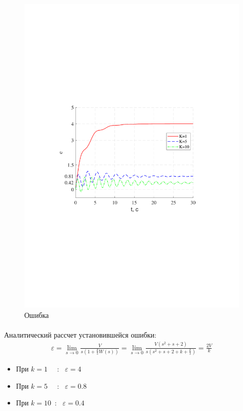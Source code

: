 \documentclass[a4paper,12pt]{article}
\begin{document}
	\begin{figure}[h!]
		\begin{center}			
		\renewcommand{\figurename}{Рисунок}
		\includegraphics[width=5in]{err2ast1MOD.pdf}
		\caption{Ошибка}
		\label{s_12}
		\end{center}
	\end{figure}
	\newpage		
	\paragraph {} Аналитический рассчет установившейся ошибки:\\
	\begin{gather}
	\varepsilon=\lim\limits_{s\rightarrow 0}\frac{V}{s(1+\frac{k}{s}W(s))}=\lim\limits_{s\rightarrow 0}\frac{V(s^2+s+2)}{s(s^2+s+2+k+\frac{k}{s})}=\frac{2V}{k}
	\end{gather}
	\begin{itemize}
		\item При $k=1$ ~~:~ $\varepsilon=4$
		\item При $k=5$ ~~:~ $\varepsilon=0.8$
		\item При $k=10$~:~ $\varepsilon=0.4$
	\end{itemize}
\end{document}
